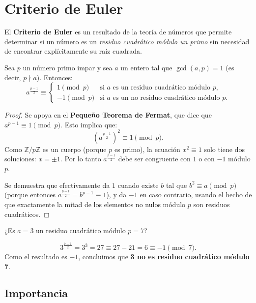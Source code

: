 \section{Criterio de Euler}

El \textbf{Criterio de Euler} es un resultado de la teoría de números que permite determinar si un número es un \emph{residuo cuadrático módulo un primo} sin necesidad de encontrar explícitamente su raíz cuadrada.

\begin{teorema}
Sea $p$ un número primo impar y sea $a$ un entero tal que $\gcd(a, p) = 1$ (es decir, $p \nmid a$). Entonces:
\[
a^{\frac{p-1}{2}} \equiv
\begin{cases}
1 \pmod{p} & \text{si } a \text{ es un residuo cuadrático módulo } p, \\
-1 \pmod{p} & \text{si } a \text{ es un no residuo cuadrático módulo } p.
\end{cases}
\]
\end{teorema}

\begin{proof}
Se apoya en el \textbf{Pequeño Teorema de Fermat}, que dice que $a^{p-1} \equiv 1 \pmod{p}$. Esto implica que:
\[
\left(a^{\frac{p-1}{2}}\right)^2 \equiv 1 \pmod{p}.
\]
Como $\mathbb{Z}/p\mathbb{Z}$ es un cuerpo (porque $p$ es primo), la ecuación $x^2 \equiv 1$ solo tiene dos soluciones: $x = \pm 1$. Por lo tanto $a^{\frac{p-1}{2}}$ debe ser congruente con $1$ o con $-1$ módulo $p$.

Se demuestra que efectivamente da $1$ cuando existe $b$ tal que $b^2 \equiv a \pmod{p}$ (porque entonces $a^{\frac{p-1}{2}} = b^{p-1} \equiv 1$), y da $-1$ en caso contrario, usando el hecho de que exactamente la mitad de los elementos no nulos módulo $p$ son residuos cuadráticos.
\end{proof}

\begin{ejemplo}
¿Es $a = 3$ un residuo cuadrático módulo $p = 7$?
\end{ejemplo}
\begin{solucion}
\[
3^{\frac{7-1}{2}} = 3^3 = 27 \equiv 27 - 21 = 6 \equiv -1 \pmod{7}.
\]
Como el resultado es $-1$, concluimos que \textbf{3 no es residuo cuadrático módulo 7}.
\end{solucion}

\subsection*{Importancia}

